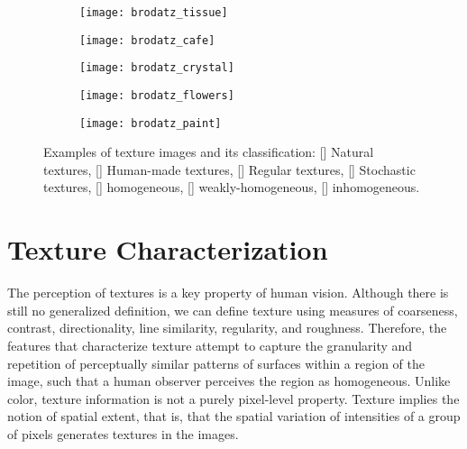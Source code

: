 \begin{figure}[!ht]
    \begin{subfigure}[b]{0.19\textwidth}
        \texttt{[image: brodatz\_tissue]}
        \caption{}
    \end{subfigure}
    \begin{subfigure}[b]{0.19\textwidth}
        \texttt{[image: brodatz\_cafe]}
        \caption{}
    \end{subfigure} 
    \begin{subfigure}[b]{0.19\textwidth}
        \texttt{[image: brodatz\_crystal]}
        \caption{}
    \end{subfigure}
    \begin{subfigure}[b]{0.19\textwidth}
        \texttt{[image: brodatz\_flowers]}
        \caption{}
    \end{subfigure}
    \begin{subfigure}[b]{0.19\textwidth}
        \texttt{[image: brodatz\_paint]}
        \caption{}
    \end{subfigure}    
                  
    \caption{Examples of texture images and its classification: [] Natural textures, [] Human-made textures, [] Regular textures, [] Stochastic textures, [] homogeneous, [] weakly-homogeneous, [] inhomogeneous.}\label{fig:texture_images}    
\end{figure}


\section{Texture Characterization}
The perception of textures is a key property of human vision. Although there is still no generalized definition, we can define texture using measures of coarseness, contrast, directionality, line similarity, regularity, and roughness. Therefore, the features that characterize texture attempt to capture the granularity and repetition of perceptually similar patterns of surfaces within a region of the image, such that a human observer perceives the region as homogeneous. Unlike color, texture information is not a purely pixel-level property. Texture implies the notion of spatial extent, that is, that the spatial variation of intensities of a group of pixels generates textures in the images.

